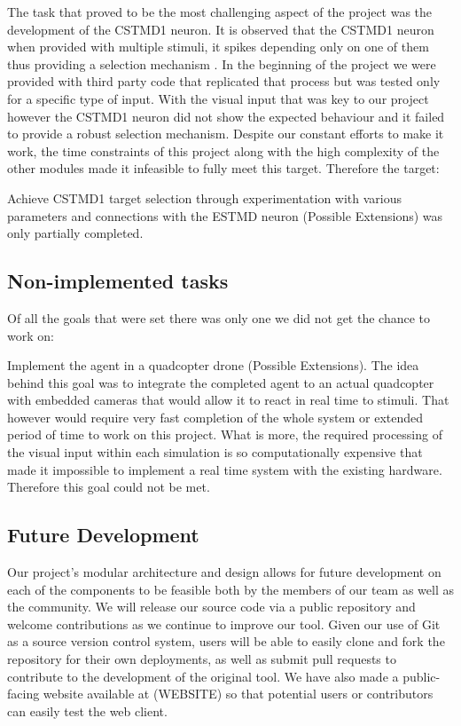 \documentclass[a4paper,11pt]{article}
\begin{document}
The task that proved to be the most challenging aspect of the project was the development of the 
CSTMD1 neuron. It is observed that the CSTMD1 neuron when provided with multiple stimuli, it spikes 
depending only on one of them thus providing a selection mechanism \cite{?}. In the beginning of 
the project we were provided with third party code that replicated that process but was tested only 
for a specific type of input. With the visual input that was key to our project however the CSTMD1 
neuron did not show the expected behaviour and it failed to provide a robust selection mechanism. 
Despite our constant efforts to make it work, the time constraints of this project along with the high 
complexity of the other modules made it infeasible to fully meet this target. Therefore the target:\\

\noindent

Achieve CSTMD1 target selection through experimentation with various parameters and connections 
with the ESTMD neuron (Possible Extensions)
was only partially completed.

\subsection{Non-implemented tasks}

Of all the goals that were set there was only one we did not get the chance to work on:

\noindent
Implement the agent in a quadcopter drone (Possible Extensions).
The idea behind this goal was to integrate the completed agent to an actual quadcopter with 
embedded cameras that would allow it to react in real time to stimuli. That however would require
very fast completion of the whole system or extended period of time to work on this project. What is 
more, the required processing of the visual input within each simulation is so computationally 
expensive that made it impossible to implement a real time system with the existing hardware. 
Therefore this goal could not be met.

\subsection{Future Development}
Our project's modular architecture and design allows for future development on each of the components to be feasible both by the members of our team as well as the community. We will release our source code via a public repository and welcome contributions as we continue to improve our tool. Given our use of Git as a source version control system, users will be able to easily clone and fork the repository for their own deployments, as well as submit pull requests to contribute to the development of the original tool. We have also made a public-facing website available at (WEBSITE) so that potential users or contributors can easily test the web client.
\end{document}
